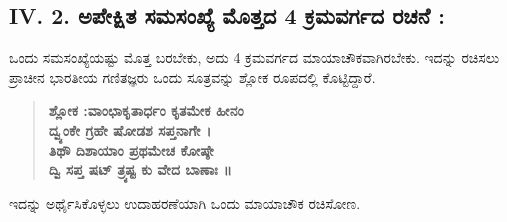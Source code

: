 \subsection*{IV. 2. ಅಪೇಕ್ಷಿತ ಸಮಸಂಖ್ಯೆ ಮೊತ್ತದ 4 ಕ್ರಮವರ್ಗದ ರಚನೆ :}

ಒಂದು ಸಮಸಂಖ್ಯೆಯಷ್ಟು ಮೊತ್ತ ಬರಬೇಕು, ಅದು 4 ಕ್ರಮವರ್ಗದ ಮಾಯಾಚೌಕವಾಗಿರಬೇಕು. ಇದನ್ನು ರಚಿಸಲು ಪ್ರಾಚೀನ ಭಾರತೀಯ ಗಣಿತಜ್ಞರು ಒಂದು ಸೂತ್ರವನ್ನು ಶ್ಲೋಕ ರೂಪದಲ್ಲಿ ಕೊಟ್ಟಿದ್ದಾರೆ.
\begin{quote}
\textbf{ಶ್ಲೋಕ :ವಾಂಛಾಕೃತಾರ್ಧಂ ಕೃತಮೇಕ ಹೀನಂ}\\
\textbf{ದ್ವ್ಯಂಕೇ ಗ್ರಹೇ ಷೋಡಶ ಸಪ್ತನಾಗೇ ।}\\
\textbf{ತಿಥೌ ದಿಶಾಯಾಂ ಪ್ರಥಮೇಚ ಕೋಷ್ಠೇ}\\
\textbf{ದ್ವಿ ಸಪ್ತ ಷಟ್ ತ್ರ್ಯಷ್ಟ ಕು ವೇದ ಬಾಣಾಃ ॥}
\end{quote}

ಇದನ್ನು ಅರ್ಥೈಸಿಕೊಳ್ಳಲು ಉದಾಹರಣೆಯಾಗಿ ಒಂದು ಮಾಯಾಚೌಕ ರಚಿಸೋಣ.
\eject

